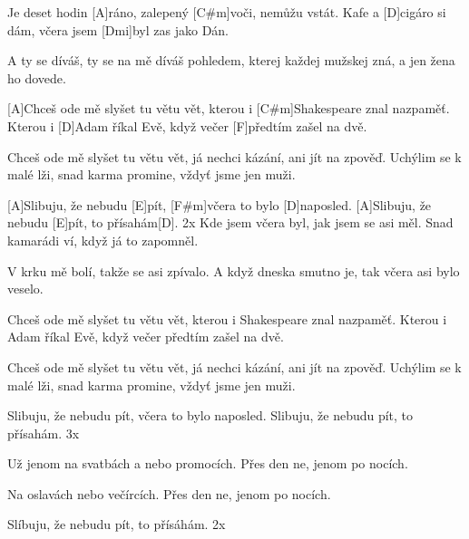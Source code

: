 
Je deset hodin [A]ráno,
zalepený [C#m]voči, nemůžu vstát.
Kafe a [D]cigáro si dám,
včera jsem [Dmi]byl zas jako Dán.

A ty se díváš,
ty se na mě díváš pohledem,
kterej každej mužskej zná,
a jen žena ho dovede.


[A]Chceš ode mě slyšet tu větu vět,
kterou i [C#m]Shakespeare znal nazpaměť.
Kterou i [D]Adam říkal Evě,
když večer [F]předtím zašel na dvě.

Chceš ode mě slyšet tu větu vět,
já nechci kázání, ani jít na zpověď.
Uchýlim se k malé lži,
snad karma promine, vždyť jsme jen muži.

[A]Slibuju, že nebudu [E]pít,
[F#m]včera to bylo [D]naposled.
[A]Slibuju, že nebudu [E]pít,
to přísahám[D]. 2x
\slpc
Kde jsem včera byl,
jak jsem se asi měl.
Snad kamarádi ví,
když já to zapomněl.

V krku mě bolí,
takže se asi zpívalo.
A když dneska smutno je,
tak včera asi bylo veselo.

Chceš ode mě slyšet tu větu vět,
kterou i Shakespeare znal nazpaměť.
Kterou i Adam říkal Evě,
když večer předtím zašel na dvě.

Chceš ode mě slyšet tu větu vět,
já nechci kázání, ani jít na zpověď.
Uchýlim se k malé lži,
snad karma promine, vždyť jsme jen muži.

Slibuju, že nebudu pít,
včera to bylo naposled.
Slibuju, že nebudu pít,
to přísahám. 3x

Už jenom na svatbách a nebo promocích.
Přes den ne, jenom po nocích.

Na oslavách nebo večírcích.
Přes den ne, jenom po nocích.

Slíbuju, že nebudu pít, to přísáhám. 2x